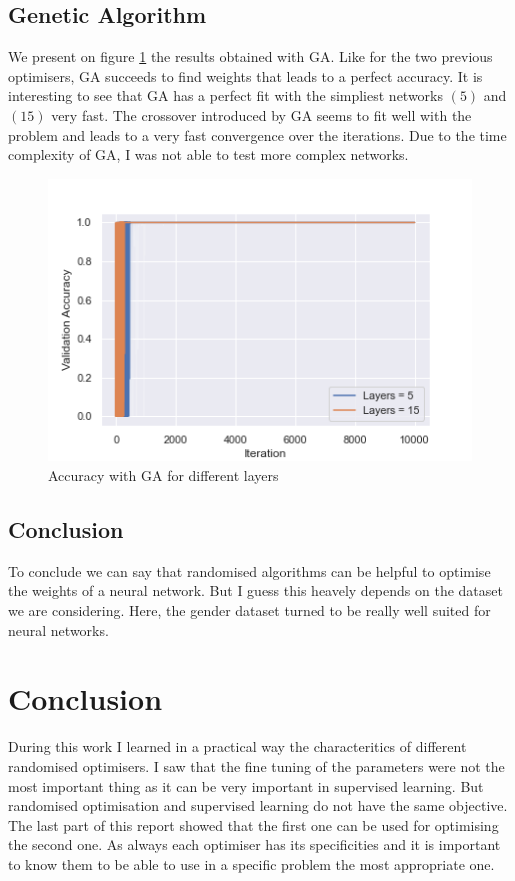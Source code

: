 \documentclass[twocolumn, 10pt]{article}
\begin{document}
		\subsection{Genetic Algorithm}
			We present on figure \ref{g:ga} the results obtained with GA. Like for the two previous optimisers, GA succeeds to find weights that leads to a perfect accuracy. It is interesting to see that GA has a perfect fit with the simpliest networks $(5)$ and $(15)$ very fast. The crossover introduced by GA seems to fit well with the problem and leads to a very fast convergence over the iterations. Due to the time complexity of GA, I was not able to test more complex networks.

			\begin{figure}[h]
				\centering
				\includegraphics[width=0.68\linewidth]{../graphics/g_GA_Iteration_Test_Error_Layers.png}
				\caption{Accuracy with GA for different layers}
				\label{g:ga}
			\end{figure}
		\subsection*{Conclusion}
			To conclude we can say that randomised algorithms can be helpful to optimise the weights of a neural network. But I guess this heavely depends on the dataset we are considering. Here, the gender dataset turned to be really well suited for neural networks.
	\section{Conclusion}
		During this work I learned in a practical way the characteritics of different randomised optimisers. I saw that the fine tuning of the parameters were not the most important thing as it can be very important in supervised learning. But randomised optimisation and supervised learning do not have the same objective. The last part of this report showed that the first one can be used for optimising the second one. As always each optimiser has its specificities and it is important to know them to be able to use in a specific problem the most appropriate one.
\end{document}
